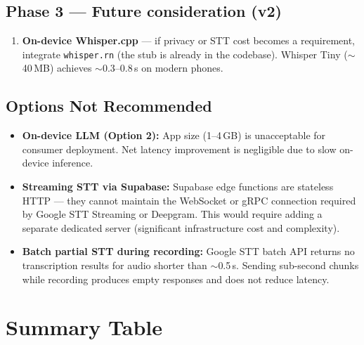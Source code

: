 \documentclass[12pt,a4paper]{article}
\begin{document}
\subsection{Phase 3 — Future consideration (v2)}

\begin{enumerate}
  \item \textbf{On-device Whisper.cpp} — if privacy or STT cost becomes a requirement,
        integrate \texttt{whisper.rn} (the stub is already in the codebase). Whisper Tiny
        ($\sim$40\,MB) achieves $\sim$0.3--0.8\,s on modern phones.
\end{enumerate}

\subsection{Options Not Recommended}

\begin{itemize}
  \item \textbf{On-device LLM (Option 2):} App size (1--4\,GB) is unacceptable for consumer
        deployment. Net latency improvement is negligible due to slow on-device inference.
  \item \textbf{Streaming STT via Supabase:} Supabase edge functions are stateless HTTP —
        they cannot maintain the WebSocket or gRPC connection required by Google STT Streaming
        or Deepgram. This would require adding a separate dedicated server (significant
        infrastructure cost and complexity).
  \item \textbf{Batch partial STT during recording:} Google STT batch API returns no
        transcription results for audio shorter than $\sim$0.5\,s. Sending sub-second chunks
        while recording produces empty responses and does not reduce latency.
\end{itemize}

\section{Summary Table}
\end{document}
